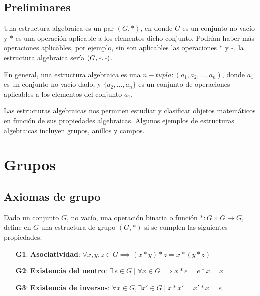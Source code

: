 \subsection*{Preliminares}

Una estructura algebraica es un par $(G, *)$, en donde $G$ es un conjunto no vacío y $*$ es una operación aplicable a los elementos dicho conjunto. Podrían haber más operaciones aplicables, por ejemplo, sin son aplicables las operaciones $*$ y $\boldsymbol{\cdot}$, la estructura algebraica sería $(G, *, \boldsymbol{\cdot})$.

En general, una estructura algebraica es una $n-tupla: (a_1, a_2, \dots, a_n)$, donde $a_1$ es un conjunto no vacío dado, y $\{ a_2, \dots, a_n \}$ es un conjunto de operaciones aplicables a los elementos del conjunto $a_1$.

Las estructuras algebraicas nos permiten estudiar y clasificar objetos matemáticos en función de sus propiedades algebraicas. Algunos ejemplos de estructuras algebraicas incluyen grupos, anillos y campos.

\section{Grupos}
\subsection{Axiomas de grupo} \label{sec:axiomas-grupo} 
\vspace{2mm}
\begin{fmd-definition}[Grupo] 
	Dado un conjunto $G$, no vacío, una operación binaria o función $*: G \times G \rightarrow G$, define en $G$ una estructura de \gls{grupo} $(G, *)$ si se cumplen las siguientes propiedades:
	\begin{enumerate}
		\item[\textbf{G1}:] \textbf{Asociatividad}: $\forall x, y, z \in G \implies (x*y)*z = x * (y*z)$
		\item[\textbf{G2}:] \textbf{Existencia del neutro}: $\exists \, e \in G \mid \forall x \in G \implies x*e = e*x = x$  
		\item[\textbf{G3}:] \textbf{Existencia de inversos}: $\forall x \in G, \exists x' \in G \mid x * x' = x'*x = e$  
	\end{enumerate}
\end{fmd-definition}

